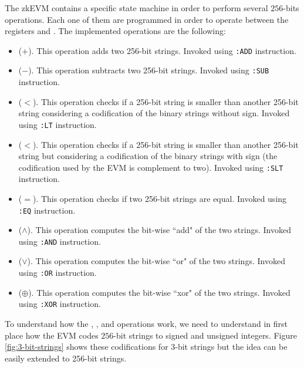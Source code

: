 The zkEVM contains a specific state machine in order to perform several $256$-bits operations. Each one of them are programmed in order to operate between the registers \A and \B. The implemented operations are the following:

\begin{itemize}
    
    \item \ADD ($+$). This operation adds two 256-bit strings. Invoked using \texttt{:ADD} instruction. 
    
    \item \SUB ($-$). This operation subtracts two 256-bit strings. Invoked using \texttt{:SUB} instruction. 
    
    \item \LT ($<$). This operation checks if a 256-bit string is smaller than another 256-bit string considering a codification of the binary strings without sign. Invoked using \texttt{:LT} instruction. 
    
    \item \SLT ($<$). This operation checks if a 256-bit string is smaller than another 256-bit string but considering a codification of the binary strings with sign (the codification used by the EVM is complement to two). Invoked using \texttt{:SLT} instruction. 
    
    \item \EQ ($=$). This operation checks if two 256-bit strings are equal. Invoked using \texttt{:EQ} instruction. 
    
    \item \AND ($\land$). This operation computes the bit-wise ``add" of the two strings. Invoked using \texttt{:AND} instruction. 
    
    \item \OR ($\lor$). This operation computes the bit-wise ``or" of the two strings. Invoked using \texttt{:OR} instruction. 
    
    \item \XOR ($\oplus$). This operation computes the bit-wise ``xor" of the two strings. Invoked using \texttt{:XOR} instruction. 
    
\end{itemize}

To understand how the \ADD, \SUB, \LT and \SLT operations work, we need to understand in first place how the EVM codes $256$-bit strings to signed and unsigned integers. Figure \ref{fig:3-bit-strings} shows these codifications for 3-bit strings but the idea can be easily extended to 256-bit strings.

